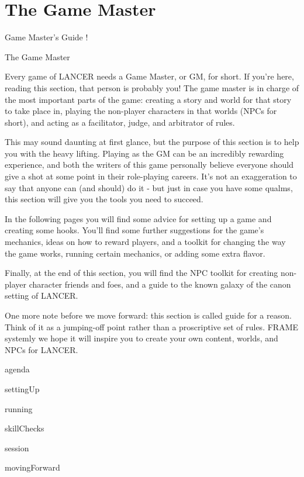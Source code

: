 \part{The Game Master}
Game Master’s Guide
!


The Game Master

Every game of LANCER needs a Game Master, or GM, for short. If you’re here, reading this
section, that person is probably you! The game master is in charge of the most important parts of
the game: creating a story and world for that story to take place in, playing the non-player
characters in that worlds (NPCs for short), and acting as a facilitator, judge, and arbitrator of
rules.


This may sound daunting at first glance, but the purpose of this section is to help you with the
heavy lifting. Playing as the GM can be an incredibly rewarding experience, and both the writers
of this game personally believe everyone should give a shot at some point in their role-playing
careers. It’s not an exaggeration to say that anyone can (and should) do it - but just in case you
have some qualms, this section will give you the tools you need to succeed.


In the following pages you will find some advice for setting up a game and creating some
hooks. You’ll find some further suggestions for the game’s mechanics, ideas on how to reward
players, and a toolkit for changing the way the game works, running certain mechanics, or
adding some extra flavor.


Finally, at the end of this section, you will find the NPC toolkit for creating non-player character
friends and foes, and a guide to the known galaxy of the canon setting of LANCER.


One more note before we move forward: this section is called guide for a reason. Think of it as a
jumping-off point rather than a proscriptive set of rules. FRAME systemly we hope it will inspire
you to create your own content, worlds, and NPCs for LANCER.

{agenda}

{settingUp}

{running}

{skillChecks}

{session}

{movingForward}





